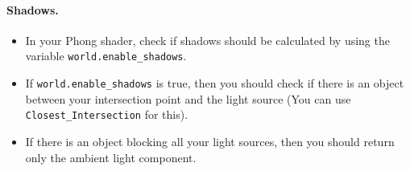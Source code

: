 \documentclass[12pt]{article}
\begin{document}
\paragraph*{Shadows.}
\begin{itemize}
\item In your Phong shader, check if shadows should be calculated by using the
  variable \texttt{world.enable\_shadows}.
\item If \texttt{world.enable\_shadows} is true, then you should check if there
  is an object between your intersection point and the light source (You can use
  \texttt{Closest\_Intersection} for this).
\item If there is an object blocking all your light sources, then you should
  return only the ambient light component.
\end{itemize}
\end{document}
